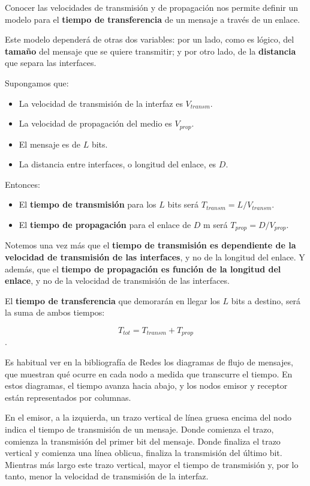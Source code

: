 \documentclass[spanish,A4,]{article}
\begin{document}
Conocer las velocidades de transmisión y de propagación nos permite
definir un modelo para el \textbf{tiempo de transferencia} de un mensaje
a través de un enlace.

Este modelo dependerá de otras dos variables: por un lado, como es
lógico, del \textbf{tamaño} del mensaje que se quiere transmitir; y por
otro lado, de la \textbf{distancia} que separa las interfaces.

Supongamos que:

\begin{itemize}
\itemsep1pt\parskip0pt
\item
  La velocidad de transmisión de la interfaz es $V_{transm}$.
\item
  La velocidad de propagación del medio es $V_{prop}$.
\item
  El mensaje es de $L$ bits.
\item
  La distancia entre interfaces, o longitud del enlace, es $D$.
\end{itemize}

Entonces:

\begin{itemize}
\itemsep1pt\parskip0pt
\item
  El \textbf{tiempo de transmisión} para los $L$ bits será
  $T_{transm} = L / V_{transm}$.
\item
  El \textbf{tiempo de propagación} para el enlace de $D$ m será
  $T_{prop} = D / V_{prop}$.
\end{itemize}

Notemos una vez más que el \textbf{tiempo de transmisión es dependiente
de la velocidad de transmisión de las interfaces}, y no de la longitud
del enlace. Y además, que el \textbf{tiempo de propagación es función de
la longitud del enlace}, y no de la velocidad de transmisión de las
interfaces.

El \textbf{tiempo de transferencia} que demorarán en llegar los $L$ bits
a destino, será la suma de ambos tiempos:

\[T_{tot} = T_{transm} + T_{prop}\].

Es habitual ver en la bibliografía de Redes los diagramas de flujo de
mensajes, que muestran qué ocurre en cada nodo a medida que transcurre
el tiempo. En estos diagramas, el tiempo avanza hacia abajo, y los nodos
emisor y receptor están representados por columnas.

En el emisor, a la izquierda, un trazo vertical de línea gruesa encima
del nodo indica el tiempo de transmisión de un mensaje. Donde comienza
el trazo, comienza la transmisión del primer bit del mensaje. Donde
finaliza el trazo vertical y comienza una línea oblicua, finaliza la
transmisión del último bit. Mientras más largo este trazo vertical,
mayor el tiempo de transmisión y, por lo tanto, menor la velocidad de
transmisión de la interfaz.
\end{document}
